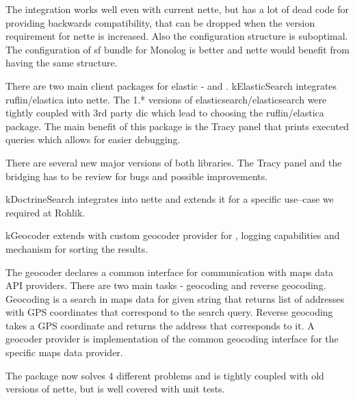 The integration works well even with current \gls{nette}, but has a lot of dead code for providing backwards compatibility, that can be dropped when the version requirement for \gls{nette} is increased. Also the configuration structure is suboptimal. The configuration of \gls{sf} bundle for Monolog is better and \gls{nette} would benefit from having the same structure.

 \label{sec:state:elastic-search}

There are two main client packages for \gls{elastic} -  and . \gls{kElasticSearch} integrates ruflin/elastica into \gls{nette}. The 1.* versions of elasticsearch/elasticsearch were tightly coupled with 3rd party \gls{dic} which lead to choosing the ruflin/elastica package. The main benefit of this package is the Tracy panel that prints executed queries which allows for easier debugging.

There are several new major versions of both libraries. The Tracy panel and the bridging has to be review for bugs and possible improvements.

 \label{sec:state:doctrine-search}

\gls{kDoctrineSearch} integrates  into \gls{nette} and extends it for a specific use--case we required at Rohlik.

 \label{sec:state:geocoder}

\gls{kGeocoder} extends  with custom geocoder provider for , logging capabilities and mechanism for sorting the results.

The geocoder declares a common interface for communication with maps data API providers. There are two main tasks - geocoding and reverse geocoding. Geocoding is a search in maps data for given string that returns list of addresses with GPS coordinates that correspond to the search query. Reverse geocoding takes a GPS coordinate and returns the address that corresponds to it. A geocoder provider is implementation of the common geocoding interface for the specific maps data provider.

The package now solves 4 different problems and is tightly coupled with old versions of \gls{nette}, but is well covered with unit tests.

